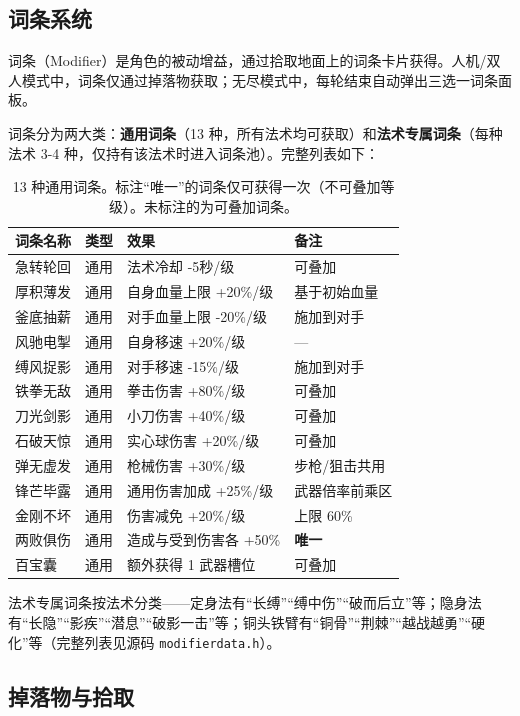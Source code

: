 \documentclass[utf8]{ctexart}
\begin{document}
\subsection{词条系统}

词条（Modifier）是角色的被动增益，通过拾取地面上的词条卡片获得。人机/双人模式中，词条仅通过掉落物获取；无尽模式中，每轮结束自动弹出三选一词条面板。

词条分为两大类：\textbf{通用词条}（13 种，所有法术均可获取）和\textbf{法术专属词条}（每种法术 3-4 种，仅持有该法术时进入词条池）。完整列表如下：

\begin{table}[H]
\centering
\begin{tabular}{p{3cm}p{1.8cm}p{2.5cm}p{4.5cm}}
\toprule
\textbf{词条名称} & \textbf{类型} & \textbf{效果} & \textbf{备注} \\
\midrule
急转轮回 & 通用 & 法术冷却 -5秒/级 & 可叠加 \\
厚积薄发 & 通用 & 自身血量上限 +20\%/级 & 基于初始血量 \\
釜底抽薪 & 通用 & 对手血量上限 -20\%/级 & 施加到对手 \\
风驰电掣 & 通用 & 自身移速 +20\%/级 & — \\
缚风捉影 & 通用 & 对手移速 -15\%/级 & 施加到对手 \\
铁拳无敌 & 通用 & 拳击伤害 +80\%/级 & 可叠加 \\
刀光剑影 & 通用 & 小刀伤害 +40\%/级 & 可叠加 \\
石破天惊 & 通用 & 实心球伤害 +20\%/级 & 可叠加 \\
弹无虚发 & 通用 & 枪械伤害 +30\%/级 & 步枪/狙击共用 \\
锋芒毕露 & 通用 & 通用伤害加成 +25\%/级 & 武器倍率前乘区 \\
金刚不坏 & 通用 & 伤害减免 +20\%/级 & 上限 60\% \\
两败俱伤 & 通用 & 造成与受到伤害各 +50\% & \textbf{唯一} \\
百宝囊 & 通用 & 额外获得 1 武器槽位 & 可叠加 \\
\bottomrule
\end{tabular}
\caption{13 种通用词条。标注“唯一”的词条仅可获得一次（不可叠加等级）。未标注的为可叠加词条。}
\end{table}

法术专属词条按法术分类——定身法有“长缚”“缚中伤”“破而后立”等；隐身法有“长隐”“影疾”“潜息”“破影一击”等；铜头铁臂有“铜骨”“荆棘”“越战越勇”“硬化”等（完整列表见源码 \texttt{modifierdata.h}）。

\subsection{掉落物与拾取}
\end{document}
